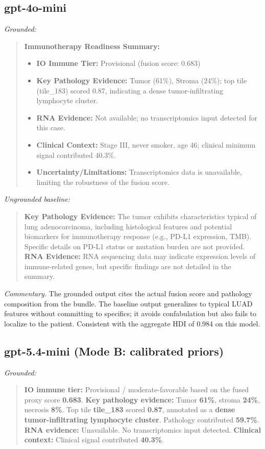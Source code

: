 \documentclass{article}
\theoremstyle{plain}
\begin{document}
\subsection{gpt-4o-mini}

\noindent\textit{Grounded:}
\begin{quote}\small
\textbf{Immunotherapy Readiness Summary:}
\begin{itemize}
  \item \textbf{IO Immune Tier:} Provisional (fusion score: 0.683)
  \item \textbf{Key Pathology Evidence:} Tumor (61\%), Stroma (24\%); top tile (tile\_183) scored 0.87, indicating a dense tumor-infiltrating lymphocyte cluster.
  \item \textbf{RNA Evidence:} Not available; no transcriptomics input detected for this case.
  \item \textbf{Clinical Context:} Stage III, never smoker, age 46; clinical minimum signal contributed 40.3\%.
  \item \textbf{Uncertainty/Limitations:} Transcriptomics data is unavailable, limiting the robustness of the fusion score.
\end{itemize}
\end{quote}

\noindent\textit{Ungrounded baseline:}
\begin{quote}\small
\textbf{Key Pathology Evidence:} The tumor exhibits characteristics typical of lung adenocarcinoma, including histological features and potential biomarkers for immunotherapy response (e.g., PD-L1 expression, TMB). Specific details on PD-L1 status or mutation burden are not provided. \textbf{RNA Evidence:} RNA sequencing data may indicate expression levels of immune-related genes, but specific findings are not detailed in the summary.
\end{quote}

\emph{Commentary.} The grounded output cites the actual fusion score and pathology composition from the bundle. The baseline output generalizes to typical LUAD features without committing to specifics; it avoids confabulation but also fails to localize to the patient. Consistent with the aggregate HDI of 0.984 on this model.

\subsection{gpt-5.4-mini (Mode B: calibrated priors)}

\noindent\textit{Grounded:}
\begin{quote}\small
\textbf{IO immune tier:} Provisional / moderate-favorable based on the fused proxy score \textbf{0.683}.
\textbf{Key pathology evidence:} Tumor \textbf{61\%}, stroma \textbf{24\%}, necrosis \textbf{8\%}. Top tile \textbf{tile\_183} scored \textbf{0.87}, annotated as a \textbf{dense tumor-infiltrating lymphocyte cluster}. Pathology contributed \textbf{59.7\%}.
\textbf{RNA evidence:} Unavailable. No transcriptomics input detected.
\textbf{Clinical context:} Clinical signal contributed \textbf{40.3\%}.
\end{quote}
\end{document}
